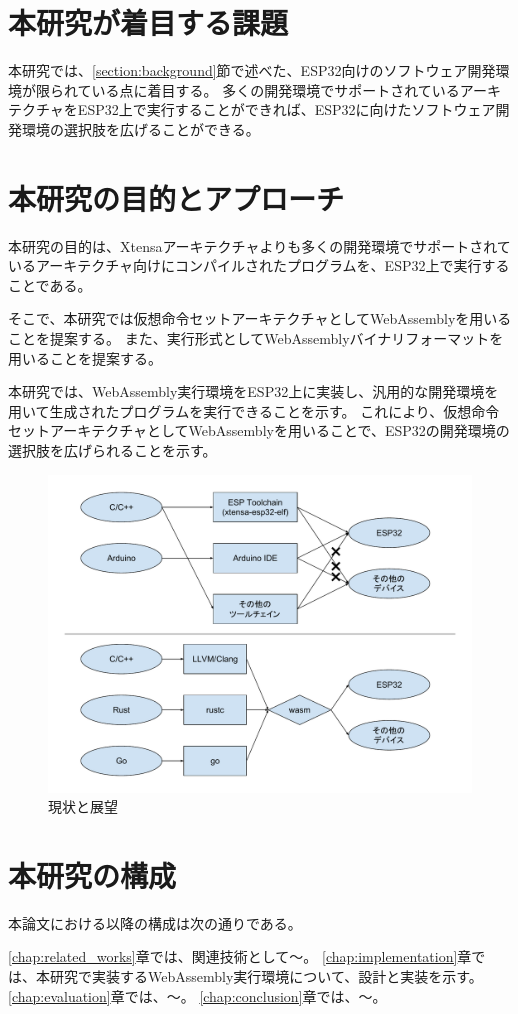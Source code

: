 \section{本研究が着目する課題}

本研究では、\ref{section:background}節で述べた、ESP32向けのソフトウェア開発環境が限られている点に着目する。
多くの開発環境でサポートされているアーキテクチャをESP32上で実行することができれば、ESP32に向けたソフトウェア開発環境の選択肢を広げることができる。

\section{本研究の目的とアプローチ}

本研究の目的は、Xtensaアーキテクチャよりも多くの開発環境でサポートされているアーキテクチャ向けにコンパイルされたプログラムを、ESP32上で実行することである。

そこで、本研究では仮想命令セットアーキテクチャとしてWebAssemblyを用いることを提案する。
また、実行形式としてWebAssemblyバイナリフォーマットを用いることを提案する。

本研究では、WebAssembly実行環境をESP32上に実装し、汎用的な開発環境を用いて生成されたプログラムを実行できることを示す。
これにより、仮想命令セットアーキテクチャとしてWebAssemblyを用いることで、ESP32の開発環境の選択肢を広げられることを示す。

\begin{figure}[htbp]
  \caption{現状と展望}
  \label{fig:new_world}
  \begin{center}
    \includegraphics[bb=0 0 800 600,width=12cm]{img/new_world.pdf}
  \end{center}
\end{figure}

\section{本研究の構成}

本論文における以降の構成は次の通りである。

\ref{chap:related_works}章では、関連技術として〜。
\ref{chap:implementation}章では、本研究で実装するWebAssembly実行環境について、設計と実装を示す。
\ref{chap:evaluation}章では、〜。
\ref{chap:conclusion}章では、〜。
